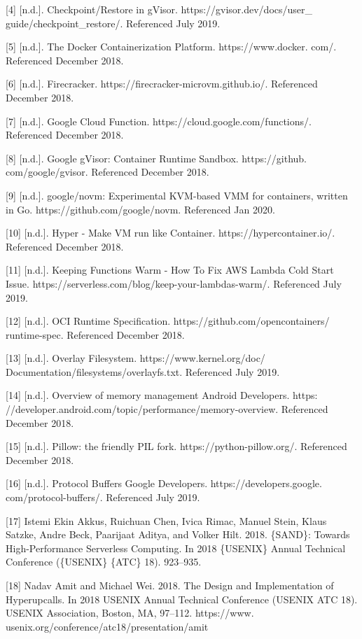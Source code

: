 \documentclass[
  10
]{article}
\begin{document}
{[}4{]} {[}n.d.{]}. Checkpoint/Restore in gVisor.
https://gvisor.dev/docs/user\_ guide/checkpoint\_restore/. Referenced
July 2019.

{[}5{]} {[}n.d.{]}. The Docker Containerization Platform.
https://www.docker. com/. Referenced December 2018.

{[}6{]} {[}n.d.{]}. Firecracker. https://firecracker-microvm.github.io/.
Referenced December 2018.

{[}7{]} {[}n.d.{]}. Google Cloud Function.
https://cloud.google.com/functions/. Referenced December 2018.

{[}8{]} {[}n.d.{]}. Google gVisor: Container Runtime Sandbox.
https://github. com/google/gvisor. Referenced December 2018.

{[}9{]} {[}n.d.{]}. google/novm: Experimental KVM-based VMM for
containers, written in Go. https://github.com/google/novm. Referenced
Jan 2020.

{[}10{]} {[}n.d.{]}. Hyper - Make VM run like Container.
https://hypercontainer.io/. Referenced December 2018.

{[}11{]} {[}n.d.{]}. Keeping Functions Warm - How To Fix AWS Lambda Cold
Start Issue. https://serverless.com/blog/keep-your-lambdas-warm/.
Referenced July 2019.

{[}12{]} {[}n.d.{]}. OCI Runtime Specification.
https://github.com/opencontainers/ runtime-spec. Referenced December
2018.

{[}13{]} {[}n.d.{]}. Overlay Filesystem. https://www.kernel.org/doc/
Documentation/filesystems/overlayfs.txt. Referenced July 2019.

{[}14{]} {[}n.d.{]}. Overview of memory management \textbar{} Android
Developers. https:
//developer.android.com/topic/performance/memory-overview. Referenced
December 2018.

{[}15{]} {[}n.d.{]}. Pillow: the friendly PIL fork.
https://python-pillow.org/. Referenced December 2018.

{[}16{]} {[}n.d.{]}. Protocol Buffers Google Developers.
https://developers.google. com/protocol-buffers/. Referenced July 2019.

{[}17{]} Istemi Ekin Akkus, Ruichuan Chen, Ivica Rimac, Manuel Stein,
Klaus Satzke, Andre Beck, Paarijaat Aditya, and Volker Hilt. 2018.
\{SAND\}: Towards High-Performance Serverless Computing. In 2018
\{USENIX\} Annual Technical Conference (\{USENIX\} \{ATC\} 18).
923--935.

{[}18{]} Nadav Amit and Michael Wei. 2018. The Design and Implementation
of Hyperupcalls. In 2018 USENIX Annual Technical Conference (USENIX ATC
18). USENIX Association, Boston, MA, 97--112. https://www.
usenix.org/conference/atc18/presentation/amit
\end{document}

